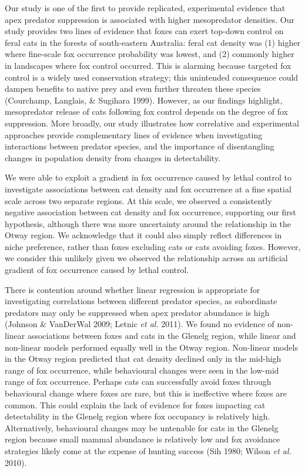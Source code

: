 \documentclass[11pt,a4paper,titlepage,twoside,openright]{style/unimelbthesis}
\begin{document}
\begin{mainmatter}
Our study is one of the first to provide replicated, experimental evidence that apex predator suppression is associated with higher mesopredator densities. Our study provides two lines of evidence that foxes can exert top-down control on feral cats in the forests of south-eastern Australia: feral cat density was (1) higher where fine-scale fox occurrence probability was lowest, and (2) commonly higher in landscapes where fox control occurred. This is alarming because targeted fox control is a widely used conservation strategy; this unintended consequence could dampen benefits to native prey and even further threaten these species (Courchamp, Langlais, \& Sugihara 1999). However, as our findings highlight, mesopredator release of cats following fox control depends on the degree of fox suppression. More broadly, our study illustrates how correlative and experimental approaches provide complementary lines of evidence when investigating interactions between predator species, and the importance of disentangling changes in population density from changes in detectability.

We were able to exploit a gradient in fox occurrence caused by lethal control to investigate associations between cat density and fox occurrence at a fine spatial scale across two separate regions. At this scale, we observed a consistently negative association between cat density and fox occurrence, supporting our first hypothesis, although there was more uncertainty around the relationship in the Otway region. We acknowledge that it could also simply reflect differences in niche preference, rather than foxes excluding cats or cats avoiding foxes. However, we consider this unlikely given we observed the relationship across an artificial gradient of fox occurrence caused by lethal control.

There is contention around whether linear regression is appropriate for investigating correlations between different predator species, as subordinate predators may only be suppressed when apex predator abundance is high (Johnson \& VanDerWal 2009; Letnic \emph{et al.} 2011). We found no evidence of non-linear associations between foxes and cats in the Glenelg region, while linear and non-linear models performed equally well in the Otway region. Non-linear models in the Otway region predicted that cat density declined only in the mid-high range of fox occurrence, while behavioural changes were seen in the low-mid range of fox occurrence. Perhaps cats can successfully avoid foxes through behavioural change where foxes are rare, but this is ineffective where foxes are common. This could explain the lack of evidence for foxes impacting cat detectability in the Glenelg region where fox occupancy is relatively high. Alternatively, behavioural changes may be untenable for cats in the Glenelg region because small mammal abundance is relatively low and fox avoidance strategies likely come at the expense of hunting success (Sih 1980; Wilson \emph{et al.} 2010).


\end{mainmatter}
\end{document}
